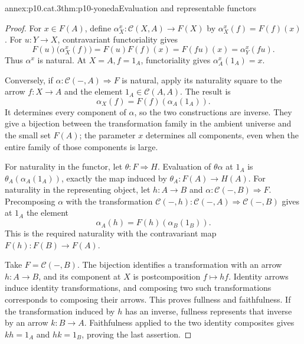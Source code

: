 \begin{annexitem}{annex:p10.cat.3}{thm:p10-yoneda}{Evaluation and representable functors}
\begin{proof}
For \(x\in F(A)\), define
\(\alpha^x_X:\mathcal C(X,A)\to F(X)\) by
\(\alpha^x_X(f)=F(f)(x)\).
For \(u:Y\to X\), contravariant functoriality gives
\[
 F(u)\bigl(\alpha^x_X(f)\bigr)
       =F(u)F(f)(x)=F(fu)(x)=\alpha^x_Y(fu).
\]
Thus \(\alpha^x\) is natural.
At \(X=A,f=1_A\), functoriality gives
\(\alpha^x_A(1_A)=x\).

Conversely, if \(\alpha:\mathcal C(-,A)\Rightarrow F\) is
natural, apply its naturality square to the arrow \(f:X\to A\)
and the element \(1_A\in\mathcal C(A,A)\).
The result is
\[
                         \alpha_X(f)=F(f)(\alpha_A(1_A)).
\]
It determines every component of \(\alpha\), so the two
constructions are inverse.  They give a bijection between the
transformation family in the ambient universe and the small set
\(F(A)\); the parameter \(x\) determines all components, even when
the entire family of those components is large.

For naturality in the functor, let \(\theta:F\Rightarrow H\).
Evaluation of \(\theta\alpha\) at \(1_A\) is
\(\theta_A(\alpha_A(1_A))\), exactly the map induced by
\(\theta_A:F(A)\to H(A)\).
For naturality in the representing object, let \(h:A\to B\)
and \(\alpha:\mathcal C(-,B)\Rightarrow F\).
Precomposing \(\alpha\) with the transformation
\(\mathcal C(-,h):\mathcal C(-,A)\Rightarrow\mathcal C(-,B)\)
gives at \(1_A\) the element
\[
                    \alpha_A(h)=F(h)(\alpha_B(1_B)).
\]
This is the required naturality with the contravariant map
\(F(h):F(B)\to F(A)\).

Take \(F=\mathcal C(-,B)\).
The bijection identifies a transformation with an arrow
\(h:A\to B\), and its component at \(X\) is postcomposition
\(f\mapsto h f\).
Identity arrows induce identity transformations, and composing
two such transformations corresponds to composing their arrows.
This proves fullness and faithfulness.
If the transformation induced by \(h\) has an inverse, fullness
represents that inverse by an arrow \(k:B\to A\).
Faithfulness applied to the two identity composites gives
\(k h=1_A\) and \(h k=1_B\), proving the last assertion.
\end{proof}
\end{annexitem}

